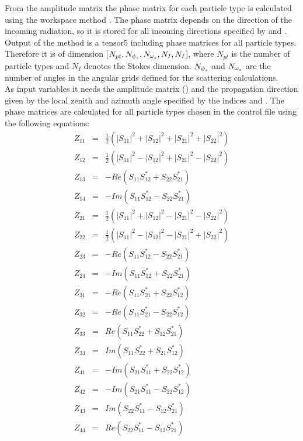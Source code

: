 From the amplitude matrix the phase matrix for each
particle type is calculated using the workspace method
. The phase matrix depends on the
direction of the incoming radiation, so it is stored for all incoming
directions specified by  and
.\\
Output of the method is a tensor5 including phase matrices for all particle
types. Therefore it is  of  dimension
[$N_{pt}, N_{{\psi_s}}, N_{{\omega_s}}, N_{I}, N_{I}$], where $N_{pt}$ is
the number of particle
types  and $N_{I}$ denotes the Stokes dimension. $N_{{\psi_s}}$ and
$N_{{\omega_s}}$ are the number of angles in the angular grids defined for
the scattering calculations.\\
As input variables it needs the amplitude matrix ()
and the propagation direction given by the local zenith and azimuth
angle specified by the indices  and
.  
The phase matrices \PhaMat{} are
calculated for all particle types chosen in the control
file using the following equations: 
\begin{eqnarray}
  Z_{11} &=& \frac{1}{2}(|S_{11}|^2+|S_{12}|^2+|S_{21}|^2+|S_{22}|^2)\\
  Z_{12} &=& \frac{1}{2}(|S_{11}|^2-|S_{12}|^2+|S_{21}|^2-|S_{22}|^2)\\
  Z_{13} &=& -Re(S_{11}S_{12}^*+S_{22}S_{21}^*)\\
  Z_{14} &=& -Im(S_{11}S_{12}^*-S_{22}S_{21}^*)\\
  Z_{21} &=& \frac{1}{2}(|S_{11}|^2+|S_{12}|^2-|S_{21}|^2-|S_{22}|^2)\\
  Z_{22} &=& \frac{1}{2}(|S_{11}|^2-|S_{12}|^2-|S_{21}|^2+|S_{22}|^2)\\
  Z_{23} &=& -Re(S_{11}S_{12}^*-S_{22}S_{21}^*)\\
  Z_{24} &=& -Im(S_{11}S_{12}^*+S_{22}S_{21}^*)\\
  Z_{31} &=& -Re(S_{11}S_{21}^*+S_{22}S_{12}^*)\\
  Z_{32} &=& -Re(S_{11}S_{21}^*-S_{22}S_{12}^*)\\
  Z_{33} &=& Re(S_{11}S_{22}^*+S_{12}S_{21}^*)\\
  Z_{34} &=& Im(S_{11}S_{22}^*+S_{21}S_{12}^*)\\
  Z_{41} &=& -Im(S_{21}S_{11}^*+S_{22}S_{12}^*)\\
  Z_{42} &=& -Im(S_{21}S_{11}^*-S_{22}S_{12}^*)\\
  Z_{43} &=& Im(S_{22}S_{11}^*-S_{12}S_{21}^*)\\
  Z_{44} &=& Re(S_{22}S_{11}^*-S_{12}S_{21}^*)
\end{eqnarray}






